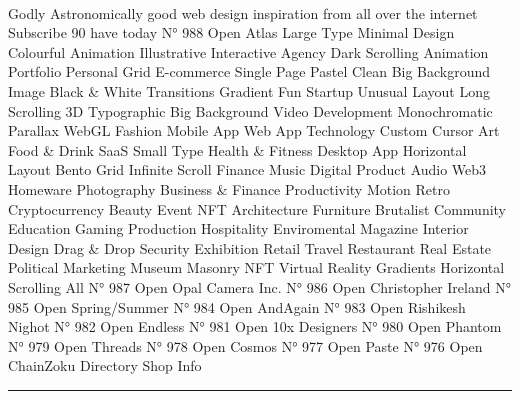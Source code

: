 \documentclass[10pt,a4paper]{article}
\begin{document}
\begin{multicols*}{2}
\paragraph{}
Godly
Astronomically good web design inspiration from all over the internet
Subscribe
90 have today
N° 988
Open
Atlas
Large Type
Minimal
Design
Colourful
Animation
Illustrative
Interactive
Agency
Dark
Scrolling Animation
Portfolio
Personal
Grid
E-commerce
Single Page
Pastel
Clean
Big Background Image
Black \& White
Transitions
Gradient
Fun
Startup
Unusual Layout
Long Scrolling
3D
Typographic
Big Background Video
Development
Monochromatic
Parallax
WebGL
Fashion
Mobile App
Web App
Technology
Custom Cursor
Art
Food \& Drink
SaaS
Small Type
Health \& Fitness
Desktop App
Horizontal Layout
Bento Grid
Infinite Scroll
Finance
Music
Digital Product
Audio
Web3
Homeware
Photography
Business \& Finance
Productivity
Motion
Retro
Cryptocurrency
Beauty
Event
NFT
Architecture
Furniture
Brutalist
Community
Education
Gaming
Production
Hospitality
Enviromental
Magazine
Interior Design
Drag \& Drop
Security
Exhibition
Retail
Travel
Restaurant
Real Estate
Political
Marketing
Museum
Masonry
NFT
Virtual Reality
Gradients
Horizontal Scrolling
All
N° 987
Open
Opal Camera Inc.
N° 986
Open
Christopher Ireland
N° 985
Open
Spring/Summer
N° 984
Open
AndAgain
N° 983
Open
Rishikesh Nighot
N° 982
Open
Endless
N° 981
Open
10x Designers
N° 980
Open
Phantom
N° 979
Open
Threads
N° 978
Open
Cosmos
N° 977
Open
Paste
N° 976
Open
ChainZoku
Directory
Shop
Info
\par\noindent\textcolor{red}{\rule{\linewidth}{0.2mm}}
\vfill
\null
\noindent\begin{minipage}{\linewidth}

\end{minipage}
\end{multicols*}
\end{document}
